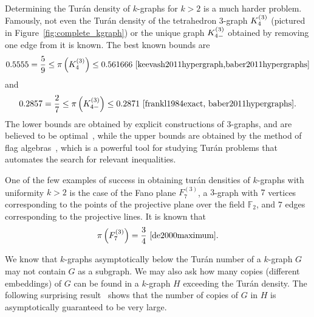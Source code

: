 Determining the Turán density of $k$-graphs for $k > 2$ is a much harder problem.
Famously, not even the Turán density of the tetrahedron $3$-graph $K^{(3)}_{4}$
(pictured in Figure~\ref{fig:complete_kgraph}) or the unique graph $K^{(3)}_{4-}$
obtained by removing one edge from it is known.
The best known bounds are
\[
    0.5555 = \frac{5}{9} \leq \pi\left(K^{(3)}_{4}\right) \leq 0.561666~\cite{keevash2011hypergraph,baber2011hypergraphs}
\]
and
\[
     0.2857 = \frac{2}{7} \leq \pi\left(K^{(3)}_{4-}\right) \leq 0.2871~\cite{frankl1984exact, baber2011hypergraphs}.
\]
The lower bounds are obtained by explicit constructions of $3$-graphs, and are believed to be optimal~\cite{keevash2011hypergraph},
while the upper bounds are obtained by the method of flag algebras~\cite{razborov2007flag},
which is a powerful tool for studying Turán problems that automates the search for relevant inequalities.

One of the few examples of success in obtaining turán densities of $k$-graphs with uniformity $k > 2$ is the case of
the Fano plane $F^{(3)}_7$, a $3$-graph with $7$ vertices corresponding to the points
of the projective plane over the field $\mathbb{F}_2$,
and $7$ edges corresponding to the projective lines.
It is known that
\[
    \pi\left(F^{(3)}_7\right) = \frac{3}{4}~\cite{de2000maximum}.
\]

We know that $k$-graphs asymptotically below the Turán number of a $k$-graph $G$
may not contain $G$ as a subgraph.
We may also ask how many copies (different embeddings) of $G$ can be found in a $k$-graph $H$
exceeding the Turán density.
The following surprising result~\cite{erdHos1983supersaturated} shows that the number of copies of $G$ in $H$
is asymptotically guaranteed to be very large.

